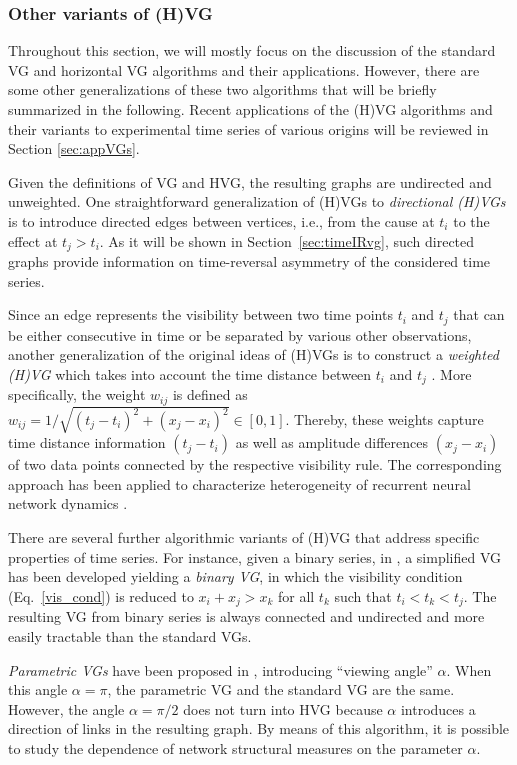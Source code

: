 		\subsubsection{Other variants of (H)VG}
		Throughout this section, we will mostly focus on the discussion of the standard VG and horizontal VG algorithms and their applications. However, there are some other generalizations of these two algorithms that will be briefly summarized in the following. Recent applications of the (H)VG algorithms and their variants to experimental time series of various origins will be reviewed in Section \ref{sec:appVGs}. 
		
		Given the definitions of VG and HVG, the resulting graphs are undirected and unweighted. One straightforward generalization of (H)VGs to \emph{directional (H)VGs} is to introduce directed edges between vertices, i.e., from the cause at $t_i$ to the effect at $t_j > t_i$. As it will be shown in Section~\ref{sec:timeIRvg}, such directed graphs provide information on time-reversal asymmetry of the considered time series. 
        
        Since an edge represents the visibility between two time points $t_i$ and $t_j$ that can be either consecutive in time or be separated by various other observations, another generalization of the original ideas of (H)VGs is to construct a \emph{weighted (H)VG} which takes into account the time distance between $t_i$ and $t_j$ \cite{Bianchi2017}. More specifically, the weight $w_{ij}$ is defined as $w_{ij} = 1 / \sqrt{(t_j - t_i)^2 + (x_j - x_i)^2} \in [0, 1]$. Thereby, these weights capture time distance information $(t_j - t_i)$ as well as amplitude differences $(x_j-x_i)$ of two data points connected by the respective visibility rule. The corresponding approach has been applied to characterize heterogeneity of recurrent neural network dynamics \cite{Bianchi2017}. 
		
		There are several further algorithmic variants of (H)VG that address specific properties of time series. For instance, given a binary series, in \cite{Ahadpour2012}, a simplified VG has been developed yielding a \emph{binary VG}, in which the visibility condition (Eq.~\ref{vis_cond}) is reduced to $x_i + x_j > x_k$ for all $t_k$ such that $t_i < t_k < t_j$. The resulting VG from binary series is always connected and undirected and more easily tractable than the standard VGs. 
		
		\emph{Parametric VGs} have been proposed in \cite{Bezsudnov2014,Snarskii2013a}, introducing ``viewing angle'' $\alpha$. When this angle $\alpha = \pi$, the parametric VG and the standard VG are the same. However, the angle $\alpha = \pi / 2$ does not turn into HVG because $\alpha$ introduces a direction of links in the resulting graph. By means of this algorithm, it is possible to study the dependence of network structural measures on the parameter $\alpha$. 
		
